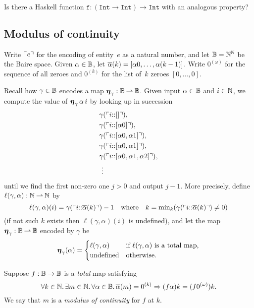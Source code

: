 \documentclass{article}
\begin{document}
Is there a Haskell function $\mathtt{f} : (\mathtt{Int} \to \mathtt{Int}) \to \mathtt{Int}$ with an analogous property?

\subsection{Modulus of continuity}
\label{sec:modulus-continuity}


Write $\ulcorner e \urcorner$ for the encoding of entity~$e$ as a natural number, and let $\mathbb{B} = \mathbb{N}^{\mathbb{N}}$ be the Baire space.
Given $\alpha \in \mathbb{B}$, let $\overline{\alpha}(k) = [\alpha 0, \ldots, \alpha (k-1)]$.
Write $0^{(\omega)}$ for the sequence of all zeroes and $0^{(k)}$ for the list of~$k$ zeroes $[0, \ldots, 0]$.

Recall how $\gamma \in \mathbb{B}$ encodes a map $\text{\boldmath{$\eta$}}_\gamma : \mathbb{B} \mathbin{\rightharpoonup} \mathbb{B}$.
%
Given input $\alpha \in \mathbb{B}$ and $i \in \mathbb{N}$, we compute the value of $\text{\boldmath{$\eta$}}_\gamma \, \alpha \, i$ by looking up in succession
%
\begin{align*}
  & \gamma (\ulcorner i {:}{:} [] \urcorner), \\
  & \gamma (\ulcorner i {:}{:} [\alpha 0] \urcorner), \\
  & \gamma (\ulcorner i {:}{:} [\alpha 0, \alpha 1] \urcorner), \\
  & \gamma (\ulcorner i {:}{:} [\alpha 0, \alpha 1] \urcorner), \\
  & \gamma (\ulcorner i {:}{:} [\alpha 0, \alpha 1, \alpha 2] \urcorner), \\
  & \ \vdots
\end{align*}
%
until we find the first non-zero one $j > 0$ and output $j - 1$.
%
More precisely, define $\ell(\gamma, \alpha) : \mathbb{N} \mathbin{\rightharpoonup} \mathbb{N}$ by
%
\begin{equation*}
  \ell(\gamma, \alpha)(i) = \gamma(\ulcorner i {:}{:} \overline{\alpha}(k) \urcorner) - 1
  \quad\text{where}\quad
  k = \min\nolimits_k (\gamma(\ulcorner i {:}{:} \overline{\alpha}(k) \urcorner) \neq 0)
\end{equation*}
%
(if not such $k$ exists then $\ell(\gamma, \alpha)(i)$ is undefined), and let the map $\text{\boldmath{$\eta$}}_\gamma : \mathbb{B} \mathbin{\rightharpoonup} \mathbb{B}$ encoded by $\gamma$ be
%
\begin{equation*}
  \text{\boldmath{$\eta$}}_{\gamma}(\alpha) =
  \begin{cases}
    \ell(\gamma, \alpha) & \text{if $\ell(\gamma, \alpha)$ is a total map,} \\
    \text{undefined} & \text{otherwise.}
  \end{cases}
\end{equation*}

Suppose $f : \mathbb{B} \to \mathbb{B}$ is a \emph{total} map satisfying
%
\begin{equation}
  \label{eq:modulus}%
  \all{k \in \NN} \some{m \in \NN}
  \all{\alpha \in \Baire} \seg{\alpha}{m} = 0^{(k)} \lthen (f \alpha) k = (f 0^{(\omega)}) k.
\end{equation}
%
We say that $m$ is a \emph{modulus of continuity} for $f$ at $k$.
\end{document}
